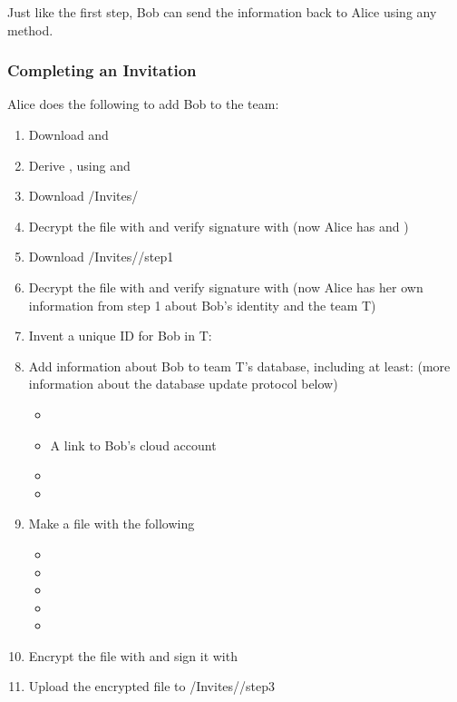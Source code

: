 \documentclass[pldi,10pt]{sigplanconf-pldi16}
\begin{document}
Just like the first step, Bob can send the information back to Alice using any method.

\subsubsection{Completing an Invitation}

Alice does the following to add Bob to the team:

\begin{enumerate}
\item Download  and 
\item Derive , using  and 
\item Download \slash Invites\slash {}
\item Decrypt the file with  and verify signature with  (now Alice has  and )
\item Download \slash Invites\slash {}\slash step1
\item Decrypt the file with  and verify signature with  (now Alice has her own information from step 1 about Bob's identity and the team T)
\item Invent a unique ID for Bob in T: 
\item Add information about Bob to team T's database, including at least: (more information about the database update protocol below)
  \begin{itemize}
  \item {}
  \item A link to Bob's cloud account
  \item {}
  \item {}
  \end{itemize}
\item Make a file with the following
  \begin{itemize}
  \item {}
  \item {}
  \item {}
  \item {}
  \item {}
  \end{itemize}
\item Encrypt the file with  and sign it with 
\item Upload the encrypted file to \slash Invites\slash {}\slash step3
\end{enumerate}
\end{document}
